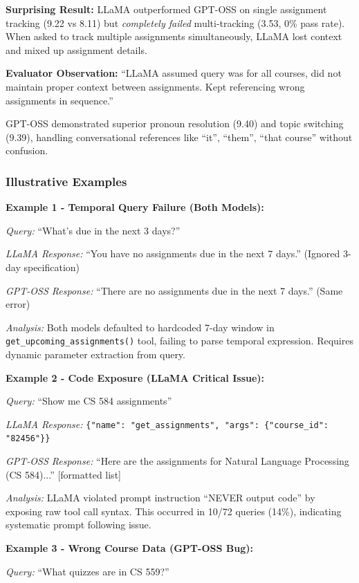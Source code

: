 \documentclass{article}
\begin{document}
\textbf{Surprising Result:} LLaMA outperformed GPT-OSS on single assignment tracking (9.22 vs 8.11) but \textit{completely failed} multi-tracking (3.53, 0\% pass rate). When asked to track multiple assignments simultaneously, LLaMA lost context and mixed up assignment details.

\textbf{Evaluator Observation:} ``LLaMA assumed query was for all courses, did not maintain proper context between assignments. Kept referencing wrong assignments in sequence.''

GPT-OSS demonstrated superior pronoun resolution (9.40) and topic switching (9.39), handling conversational references like ``it'', ``them'', ``that course'' without confusion.

\subsubsection{Illustrative Examples}

\textbf{Example 1 - Temporal Query Failure (Both Models):}

\textit{Query:} ``What's due in the next 3 days?''

\textit{LLaMA Response:} ``You have no assignments due in the next 7 days.'' (Ignored 3-day specification)

\textit{GPT-OSS Response:} ``There are no assignments due in the next 7 days.'' (Same error)

\textit{Analysis:} Both models defaulted to hardcoded 7-day window in \texttt{get\_upcoming\_assignments()} tool, failing to parse temporal expression. Requires dynamic parameter extraction from query.

\textbf{Example 2 - Code Exposure (LLaMA Critical Issue):}

\textit{Query:} ``Show me CS 584 assignments''

\textit{LLaMA Response:} \texttt{\{"name": "get\_assignments", "args": \{"course\_id": "82456"\}\}}

\textit{GPT-OSS Response:} ``Here are the assignments for Natural Language Processing (CS 584)...'' [formatted list]

\textit{Analysis:} LLaMA violated prompt instruction ``NEVER output code'' by exposing raw tool call syntax. This occurred in 10/72 queries (14\%), indicating systematic prompt following issue.

\textbf{Example 3 - Wrong Course Data (GPT-OSS Bug):}

\textit{Query:} ``What quizzes are in CS 559?''
\end{document}
